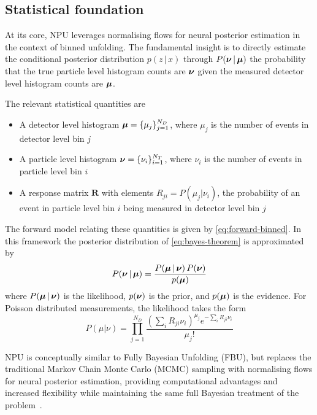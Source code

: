 \subsection{Statistical foundation}
    At its core, NPU leverages normalising flows for neural posterior estimation in the context of binned unfolding.
    The fundamental insight is to directly estimate the conditional posterior distribution \(p(z\,| \,x)\) through \(P(\vb*\nu\,|\, \vb*\mu)\) the probability that the true particle level histogram counts are $\vb*\nu$ given the measured detector level histogram counts are $\vb*\mu$.

    The relevant statistical quantities are
        \begin{itemize}
        \item A detector level histogram $\vb*\mu = \{\mu_j\}_{j=1}^{N_D}$, where $\mu_j$ is the number of events in detector level bin $j$
        \item A particle level histogram $\vb*\nu = \{\nu_i\}_{i=1}^{N_T}$, where $\nu_i$ is the number of events in particle level bin $i$
        \item A response matrix $\mathbf{R}$ with elements $R_{ji} = P(\mu_j|\nu_i)$, the probability of an event in particle level bin $i$ being measured in detector level bin $j$
    \end{itemize}
    The forward model relating these quantities is given by \cref{eq:forward-binned}.
    In this framework the posterior distribution of \cref{eq:bayes-theorem} is approximated by
    \[
        P(\vb*\nu\,|\,\vb*\mu) = \frac{P(\vb*\mu\,|\,\vb*\nu)\,P(\vb*\nu)}{p(\vb*\mu)}
    \]
    where $P(\vb*\mu\,|\,\vb*\nu)$ is the likelihood, $p(\vb*\nu)$ is the prior, and $p(\vb*\mu)$ is the evidence.
    For Poisson distributed measurements, the likelihood takes the form
    \[
        P(\mu|\nu) = \prod_{j=1}^{N_D} \frac{(\sum_i R_{ji}\nu_i)^{\mu_j} e^{-\sum_i R_{ji}\nu_i}}{\mu_j!}
    \]
    
    NPU is conceptually similar to Fully Bayesian Unfolding (FBU), but replaces the traditional Markov Chain Monte Carlo (MCMC) sampling with normalising flows for neural posterior estimation, providing computational advantages and increased flexibility while maintaining the same full Bayesian treatment of the problem~\cite{Rezende2015VariationalFlows}.
